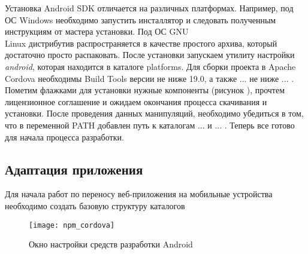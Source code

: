Установка Android SDK отличается на различных платформах. Например, под ОС Windows необходимо запустить инсталлятор и следовать полученным инструкциям от мастера установки. Под ОС GNU\\Linux дистрибутив распространяется в качестве простого архива, который достаточно просто распаковать. После установки запускаем утилиту настройки \textit{android}, которая находится в каталоге platforms. Для сборки проекта в Apache Cordova необходимы Build Tools версии не ниже 19.0, а также ... не ниже ... . Пометим флажками для установки нужные компоненты (рисунок ), прочтем лицензионное соглашение и ожидаем окончания процесса скачивания и установки. После проведения данных манипуляций, необходимо убедиться в том, что в переменной PATH добавлен путь к каталогам ... и ... . Теперь все готово для начала процесса разработки.

\subsection{Адаптация приложения}
Для начала работ по переносу веб-приложения на мобильные устройства необходимо создать базовую структуру каталогов

\begin{figure}[ht]
\center\texttt{[image: npm\_cordova]}
\caption{Окно настройки средств разработки Android}\label{npm_cordova}
\end{figure}